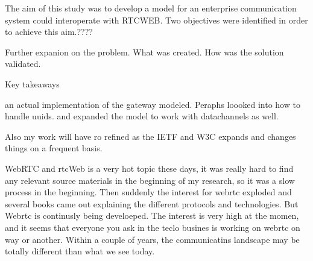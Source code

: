 The aim of this study was to develop a model for an enterprise communication system could interoperate with RTCWEB. Two objectives were identified in order to achieve this aim.????

Further expanion on the problem. What was created. How was the solution validated.

Key takeaways

an actual implementation of the gateway modeled. Peraphs loooked into how to handle uuids. and expanded the model to work with datachannels as well.

Also my work will have ro refined as the IETF and W3C expands and changes things on a frequent basis.


WebRTC and rtcWeb is a very hot topic these days, it was really hard to find any relevant source materials in the beginning of my research, so it was a slow process in the beginning. Then suddenly the interest for webrtc exploded and several books came out explaining the different protocols and technologies. But Webrtc is continusly being develoeped. The interest is very high at the momen, and it seems that everyone you ask in the teclo busines is working on webrtc on way or another. Within a couple of years, the communicatins landscape may be totally different than what we see today.